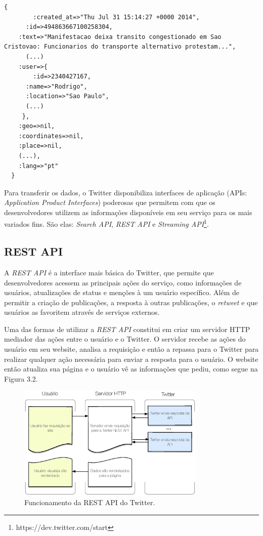 \begin{lstlisting}[caption=Estrutura JSON de uma publicação]
	{
		:created_at=>"Thu Jul 31 15:14:27 +0000 2014",
	  :id=>494863667100258304,
    :text=>"Manifestacao deixa transito congestionado em Sao Cristovao: Funcionarios do transporte alternativo protestam...",
	  (...)
    :user=>{
    	:id=>2340427167,	
      :name=>"Rodrigo",
      :location=>"Sao Paulo",
      (...)
     },
    :geo=>nil,
    :coordinates=>nil,
    :place=>nil,
    (...),
    :lang=>"pt"
  }
\end{lstlisting}

Para transferir os dados, o Twitter disponibiliza interfaces de aplicação (APIs: \textit{Application Product Interfaces}) poderosas que permitem com que os desenvolvedores utilizem as informações disponíveis em seu serviço para os mais variados fins. São elas: \textit{Search API}, \textit{REST API} e \textit{Streaming API}\footnote{https://dev.twitter.com/start}.

\subsection*{REST API}

A \textit{REST API} é a interface mais básica do Twitter, que permite que desenvolvedores acessem as principais ações do serviço, como informações de usuários, atualizações de status e menções à um usuário específico. Além de permitir a criação de publicações, a resposta à outras publicações, o \textit{retweet} e que usuários as favoritem através de serviços externos. 

Uma das formas de utilizar a \textit{REST API} constitui em criar um servidor HTTP mediador das ações entre o usuário e o Twitter. O servidor recebe as ações do usuário em seu website, analisa a requisição e então a repassa para o Twitter para realizar qualquer ação necessária para enviar a resposta para o usuário. O website então atualiza sua página e o usuário vê as informações que pediu, como segue na Figura 3.2.

\begin{figure}[htpb]
	\begin{center}
	\includegraphics[width=0.8\textwidth]{figuras/twitter-rest-api.eps}
	\caption{Funcionamento da REST API do Twitter.}
	\end{center}
\end{figure}

